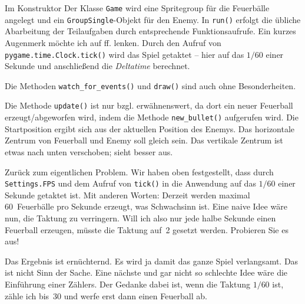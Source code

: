 
Im Konstruktor Der Klasse \texttt{Game} wird eine Spritegroup für die Feuerbälle angelegt und ein \texttt{GroupSingle}-Objekt für den Enemy. In \texttt{run()} erfolgt die übliche Abarbeitung der Teilaufgaben durch entsprechende Funktionsaufrufe. Ein kurzes Augenmerk möchte ich auf ff. lenken. Durch den Aufruf von \texttt{pygame.time.Clock.tick()} wird das Spiel getaktet -- hier auf das $1/60$ einer Sekunde und anschließend die \emph{Deltatime} berechnet. 


Die Methoden \texttt{watch\_for\_events()} und \texttt{draw()} sind auch ohne Besonderheiten.


Die Methode \texttt{update()} ist nur bzgl.  erwähnenswert, da dort ein neuer Feuerball erzeugt/abgeworfen wird, indem die Methode \texttt{new\_bullet()} aufgerufen wird. Die Startposition ergibt sich aus der aktuellen Position des Enemys. Das horizontale Zentrum von Feuerball und Enemy soll gleich sein. Das vertikale Zentrum ist etwas nach unten verschoben; sieht besser aus. 

\newpage
{} 


Zurück zum eigentlichen Problem. Wir haben oben festgestellt, dass durch \texttt{Settings.FPS} und dem Aufruf von \texttt{tick()} in  die Anwendung auf das $1/60$ einer Sekunde getaktet ist. Mit anderen Worten: Derzeit werden maximal 60~Feuerbälle pro Sekunde erzeugt, was Schwachsinn ist. Eine naive Idee wäre nun, die Taktung zu verringern. Will ich also nur jede halbe Sekunde einen Feuerball erzeugen, müsste die Taktung auf~2 gesetzt werden. Probieren Sie es aus!

Das Ergebnis ist ernüchternd. Es wird ja damit das ganze Spiel verlangsamt. Das ist nicht Sinn der Sache. Eine nächste und gar nicht so schlechte Idee wäre die Einführung einer Zählers. Der Gedanke dabei ist, wenn die Taktung $1/60$ ist, zähle ich bis~30 und werfe erst dann einen Feuerball ab. 

